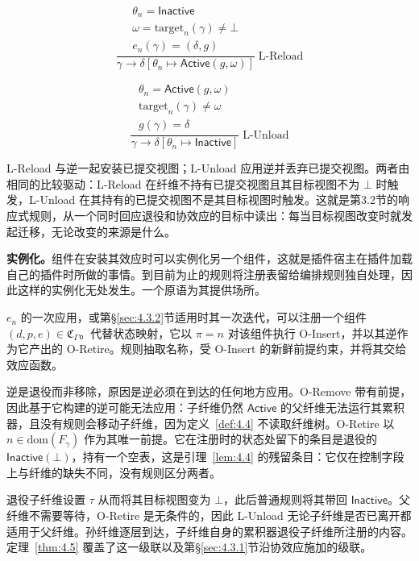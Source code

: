 \[
\frac{
\begin{array}{c}
\theta_n = \mathsf{Inactive} \\
\omega = \mathrm{target}_n(\gamma) \neq \bot \\
e_n(\gamma) = (\delta, g)
\end{array}
}{
\gamma \longrightarrow \delta[\theta_n \mapsto \mathsf{Active}(g, \omega)]
}\;\text{L-Reload}
\]

\[
\frac{
\begin{array}{c}
\theta_n = \mathsf{Active}(g, \omega) \\
\mathrm{target}_n(\gamma) \neq \omega \\
g(\gamma) = \delta
\end{array}
}{
\gamma \longrightarrow \delta[\theta_n \mapsto \mathsf{Inactive}]
}\;\text{L-Unload}
\]

L-Reload 与逆一起安装已提交视图；L-Unload 应用逆并丢弃已提交视图。两者由相同的比较驱动：L-Reload 在纤维不持有已提交视图且其目标视图不为 $\bot$ 时触发，L-Unload 在其持有的已提交视图不是其目标视图时触发。这就是第3.2节的响应式规则，从一个同时回应退役和协效应的目标中读出：每当目标视图改变时就发起迁移，无论改变的来源是什么。

\textbf{实例化。}组件在安装其效应时可以实例化另一个组件，这就是插件宿主在插件加载自己的插件时所做的事情。到目前为止的规则将注册表留给编排规则独自处理，因此这样的实例化无处发生。一个原语为其提供场所。

\begin{definition}\label{def:4.5}
$e_n$ 的一次应用，或第\S\ref{sec:4.3.2}节适用时其一次迭代，可以注册一个组件 $(d, p, e) \in \mathfrak{C}_\Gamma$。代替状态映射，它以 $\pi = n$ 对该组件执行 O-Insert，并以其逆作为它产出的 O-Retire。规则抽取名称，受 O-Insert 的新鲜前提约束，并将其交给效应函数。
\end{definition}

逆是退役而非移除，原因是逆必须在到达的任何地方应用。O-Remove 带有前提，因此基于它构建的逆可能无法应用：子纤维仍然 $\mathsf{Active}$ 的父纤维无法运行其累积器，且没有规则会移动子纤维，因为定义~\ref{def:4.4} 不读取纤维树。O-Retire 以 $n \in \mathrm{dom}(F_\gamma)$ 作为其唯一前提。它在注册时的状态处留下的条目是退役的 $\mathsf{Inactive}(\bot)$，持有一个空表，这是引理~\ref{lem:4.4} 的残留条目：它仅在控制字段上与纤维的缺失不同，没有规则区分两者。

退役子纤维设置 $\tau$ 从而将其目标视图变为 $\bot$，此后普通规则将其带回 $\mathsf{Inactive}$。父纤维不需要等待，O-Retire 是无条件的，因此 L-Unload 无论子纤维是否已离开都适用于父纤维。孙纤维逐层到达，子纤维自身的累积器退役子纤维所注册的内容。定理~\ref{thm:4.5} 覆盖了这一级联以及第\S\ref{sec:4.3.1}节沿协效应施加的级联。

